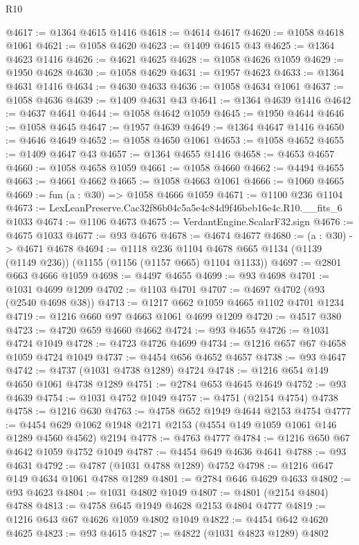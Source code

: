 \begin{lexlean}{R10}
\begin{coremodule}
@4617 := @1364 @4615 @1416
@4618 := @4614 @4617
@4620 := @1058 @4618 @1061
@4621 := @1058 @4620
@4623 := @1409 @4615 @43
@4625 := @1364 @4623 @1416
@4626 := @4621 @4625
@4628 := @1058 @4626 @1059
@4629 := @1950 @4628
@4630 := @1058 @4629
@4631 := @1957 @4623
@4633 := @1364 @4631 @1416
@4634 := @4630 @4633
@4636 := @1058 @4634 @1061
@4637 := @1058 @4636
@4639 := @1409 @4631 @43
@4641 := @1364 @4639 @1416
@4642 := @4637 @4641
@4644 := @1058 @4642 @1059
@4645 := @1950 @4644
@4646 := @1058 @4645
@4647 := @1957 @4639
@4649 := @1364 @4647 @1416
@4650 := @4646 @4649
@4652 := @1058 @4650 @1061
@4653 := @1058 @4652
@4655 := @1409 @4647 @43
@4657 := @1364 @4655 @1416
@4658 := @4653 @4657
@4660 := @1058 @4658 @1059
@4661 := @1058 @4660
@4662 := @4494 @4655
@4663 := @4661 @4662
@4665 := @1058 @4663 @1061
@4666 := @1060 @4665
@4669 := fun (a : @30) => @1058 @4666 @1059
@4671 := @1100 @236 @1104
@4673 := LexLeanPreserve.Cac32f86b04c5a5e4c84d9f46beb16e4c.R10.__fits_6 @1033
@4674 := @1106 @4673
@4675 := VerdantEngine.ScalarF32.sign
@4676 := @4675 @1033
@4677 := @93 @4676
@4678 := @4674 @4677
@4680 := (a : @30) -> @4671 @4678
@4694 := @1118
    @236
    @1104
    @4678
    @665
    @1134
    (@1139 (@1149 @236))
    (@1155 (@1156 (@1157 @665) @1104 @1133))
@4697 := @2801 @663 @4666 @1059
@4698 := @4497 @4655
@4699 := @93 @4698
@4701 := @1031 @4699 @1209
@4702 := @1103 @4701
@4707 := @4697 @4702 (@93 (@2540 @4698 @38))
@4713 := @1217 @662 @1059 @4665 @1102 @4701 @1234
@4719 := @1216 @660 @97 @4663 @1061 @4699 @1209
@4720 := @4517 @380
@4723 := @4720 @659 @4660 @4662
@4724 := @93 @4655
@4726 := @1031 @4724 @1049
@4728 := @4723 @4726 @4699
@4734 := @1216 @657 @67 @4658 @1059 @4724 @1049
@4737 := @4454 @656 @4652 @4657
@4738 := @93 @4647
@4742 := @4737 (@1031 @4738 @1289) @4724
@4748 := @1216 @654 @149 @4650 @1061 @4738 @1289
@4751 := @2784 @653 @4645 @4649
@4752 := @93 @4639
@4754 := @1031 @4752 @1049
@4757 := @4751 (@2154 @4754) @4738
@4758 := @1216 @630
@4763 := @4758 @652 @1949 @4644 @2153 @4754
@4777 := @4454 @629 @1062 @1948 @2171 @2153 (@4554 @149 @1059 @1061 @146 @1289 @4560 @4562) @2194
@4778 := @4763 @4777
@4784 := @1216 @650 @67 @4642 @1059 @4752 @1049
@4787 := @4454 @649 @4636 @4641
@4788 := @93 @4631
@4792 := @4787 (@1031 @4788 @1289) @4752
@4798 := @1216 @647 @149 @4634 @1061 @4788 @1289
@4801 := @2784 @646 @4629 @4633
@4802 := @93 @4623
@4804 := @1031 @4802 @1049
@4807 := @4801 (@2154 @4804) @4788
@4813 := @4758 @645 @1949 @4628 @2153 @4804 @4777
@4819 := @1216 @643 @67 @4626 @1059 @4802 @1049
@4822 := @4454 @642 @4620 @4625
@4823 := @93 @4615
@4827 := @4822 (@1031 @4823 @1289) @4802

\end{coremodule}
\end{lexlean}
